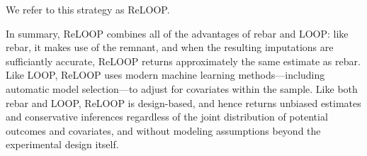 We refer to this strategy as ReLOOP.

In summary, ReLOOP combines all of the advantages of rebar and LOOP:
like rebar, it makes use of the remnant, and when the resulting
imputations are sufficiantly accurate, ReLOOP returns approximately
the same estimate as rebar.
Like LOOP, ReLOOP uses modern machine learning methods---including
automatic model selection---to adjust for
covariates within the sample.
Like both rebar and LOOP, ReLOOP is design-based, and hence returns
unbiased estimates and conservative inferences regardless of the
joint distribution of potential outcomes and covariates, and without
modeling assumptions beyond the experimental design itself.





